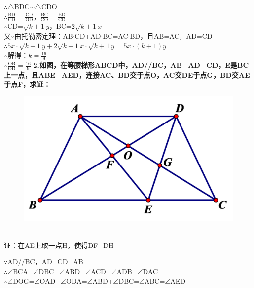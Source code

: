 \documentclass{article}
\begin{document}
    $\therefore $\quad $\bigtriangleup $BDC$\sim $$\bigtriangleup $CDO \\
    $\therefore $\quad $\frac{\text{BD}}{\text{CD}}=\frac{\text{CD}}{\text{OD}}$，$\frac{\text{BC}}{\text{CO}}=\frac{\text{BD}}{\text{CD}}$\\
    $\therefore $\quad CD=$\sqrt{k+1}y$，BC=$2\sqrt{k+1}x$ \\
    又$\because $\quad 由托勒密定理：AB$\cdot $CD+AD$\cdot $BC=AC$\cdot $BD，且AB=AC，AD=CD \\
    $\therefore $\quad $5x\cdot\sqrt{k+1}y+2\sqrt{k+1}x\cdot\sqrt{k+1}y=5x\cdot (k+1)y$ \\
    $\therefore $\quad 解得：$k=\frac{16}{9}$ \\
    $\therefore $\quad $\frac{\text{OB}}{\text{OD}}=\frac{16}{9}$
    \newpage
    \noindent \textbf{2.如图，在等腰梯形ABCD中，AD//BC，AB=AD=CD，E是BC上一点，且\bm{$\angle $}ABE=\bm{$\angle $}AED，连接AC、BD交于点O，AC交DE于点G，BD交AE于点F，求证：} \\
    \begin{figure}[ht]
        \centering
        \includegraphics[scale=0.2]{2.png}
    \end{figure}\\
    证：在AE上取一点H，使得DF=DH \\
    \begin{minipage}[b]{0.65\linewidth}
        $\because $\quad AD//BC，AD=CD=AB \\
        $\therefore $\quad $\angle $BCA=$\angle $DBC=$\angle $ABD=$\angle $ACD=$\angle $ADB=$\angle $DAC \\
        $\therefore $\quad $\angle $DOG=$\angle $OAD+$\angle $ODA=$\angle $ABD+$\angle $DBC=$\angle $ABC=$\angle $AED \\

\end{minipage}$$
\end{document}
